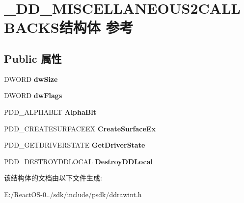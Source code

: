 \hypertarget{struct___d_d___m_i_s_c_e_l_l_a_n_e_o_u_s2_c_a_l_l_b_a_c_k_s}{}\section{\+\_\+\+D\+D\+\_\+\+M\+I\+S\+C\+E\+L\+L\+A\+N\+E\+O\+U\+S2\+C\+A\+L\+L\+B\+A\+C\+K\+S结构体 参考}
\label{struct___d_d___m_i_s_c_e_l_l_a_n_e_o_u_s2_c_a_l_l_b_a_c_k_s}
\subsection*{Public 属性}
\begin{DoxyCompactItemize}
\item 
\mbox{\label{struct___d_d___m_i_s_c_e_l_l_a_n_e_o_u_s2_c_a_l_l_b_a_c_k_s_a0bb5913c37ffe17fc3ad7a384d693351}} 
D\+W\+O\+RD {\bfseries dw\+Size}
\item 
\mbox{\label{struct___d_d___m_i_s_c_e_l_l_a_n_e_o_u_s2_c_a_l_l_b_a_c_k_s_a3d45edc49b7c298fe5ed5f1c3399a7b4}} 
D\+W\+O\+RD {\bfseries dw\+Flags}
\item 
\mbox{\label{struct___d_d___m_i_s_c_e_l_l_a_n_e_o_u_s2_c_a_l_l_b_a_c_k_s_a338b3d3c111a998f8f0c265cb1e49a1e}} 
P\+D\+D\+\_\+\+A\+L\+P\+H\+A\+B\+LT {\bfseries Alpha\+Blt}
\item 
\mbox{\label{struct___d_d___m_i_s_c_e_l_l_a_n_e_o_u_s2_c_a_l_l_b_a_c_k_s_a95dafaae440ed8b98888f6f9841267fc}} 
P\+D\+D\+\_\+\+C\+R\+E\+A\+T\+E\+S\+U\+R\+F\+A\+C\+E\+EX {\bfseries Create\+Surface\+Ex}
\item 
\mbox{\label{struct___d_d___m_i_s_c_e_l_l_a_n_e_o_u_s2_c_a_l_l_b_a_c_k_s_ab12872059359d84607b6b386a807f887}} 
P\+D\+D\+\_\+\+G\+E\+T\+D\+R\+I\+V\+E\+R\+S\+T\+A\+TE {\bfseries Get\+Driver\+State}
\item 
\mbox{\label{struct___d_d___m_i_s_c_e_l_l_a_n_e_o_u_s2_c_a_l_l_b_a_c_k_s_a5915391cfe6e939a4057910fce6369c8}} 
P\+D\+D\+\_\+\+D\+E\+S\+T\+R\+O\+Y\+D\+D\+L\+O\+C\+AL {\bfseries Destroy\+D\+D\+Local}
\end{DoxyCompactItemize}


该结构体的文档由以下文件生成\+:\begin{DoxyCompactItemize}
\item 
E\+:/\+React\+O\+S-\/0../sdk/include/psdk/ddrawint.\+h\end{DoxyCompactItemize}
